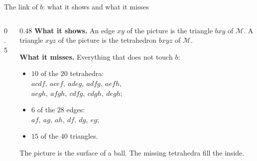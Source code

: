 \begin{frame}{The link of \(b\): what it shows and what it misses}
\begin{columns}[c]
\begin{column}{0.5\textwidth}\centering
{}
\end{column}
\begin{column}{0.48\textwidth}
\textbf{What it shows.} An edge \(xy\) of the picture is the triangle \(bxy\) of \(\mathcal M\). A triangle \(xyz\) of the picture is the tetrahedron \(bxyz\) of \(\mathcal M\).
\par\medskip
\textbf{What it misses.} Everything that does not touch \(b\):
\begin{itemize}
\setlength{\itemsep}{4pt}
\item \(10\) of the \(20\) tetrahedra:\\ \(acdf,\ acef,\ adeg,\ adfg,\ aefh,\)\\ \(aegh,\ afgh,\ cdfg,\ cdgh,\ degh\);
\item \(6\) of the \(28\) edges:\\ \(af,\ ag,\ ah,\ df,\ dg,\ eg\);
\item \(15\) of the \(40\) triangles.
\end{itemize}
\par\medskip
The picture is the surface of a ball. The missing tetrahedra fill the inside.
\end{column}
\end{columns}
\end{frame}

